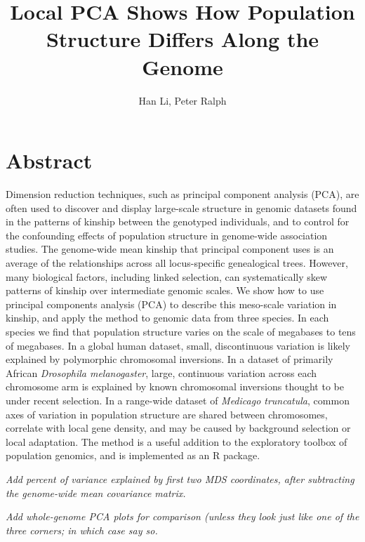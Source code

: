 \documentclass[11pt, oneside]{article}   	%
\title{Local PCA Shows How Population Structure Differs Along the Genome}
\author{Han Li, Peter Ralph}
\newcommand{\plr}[1]{{\em \color{blue} #1}}
\begin{document}
\maketitle
\doublespacing


\section*{Abstract}

Dimension reduction techniques,
such as principal component analysis (PCA),
are often used to discover and display large-scale structure in genomic datasets
found in the patterns of kinship
between the genotyped individuals,
and to control for the confounding effects of population structure in genome-wide association studies.
The genome-wide mean kinship that principal component uses
is an average of the relationships across all locus-specific genealogical trees.
However, many biological factors,
including linked selection,
can systematically skew patterns of kinship over intermediate genomic scales.
We show how to use principal components analysis (PCA) to describe this meso-scale variation in kinship,
and apply the method to genomic data from three species.
In each species we find that population structure varies on the scale of megabases to tens of megabases.
In a global human dataset, small, discontinuous variation is likely explained by polymorphic chromosomal inversions.
In a dataset of primarily African \textit{Drosophila melanogaster}, large, continuous variation across each chromosome arm
is explained by known chromosomal inversions thought to be under recent selection.
In a range-wide dataset of \textit{Medicago truncatula},
common axes of variation in population structure are shared between chromosomes,
correlate with local gene density,
and may be caused by background selection or local adaptation.
The method is a useful addition to the exploratory toolbox
of population genomics,
and is implemented as an R package.

\plr{Add percent of variance explained by first two MDS coordinates, after subtracting the genome-wide mean covariance matrix.}

\plr{Add whole-genome PCA plots for comparison (unless they look just like one of the three corners; in which case say so.}
\end{document}
